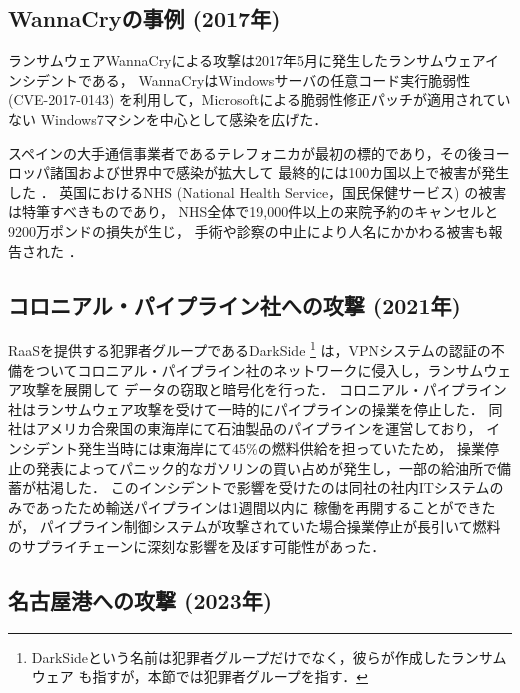 \subsection{WannaCryの事例 (2017年)}
ランサムウェアWannaCryによる攻撃は2017年5月に発生したランサムウェアインシデントである，
WannaCryはWindowsサーバの任意コード実行脆弱性 (CVE-2017-0143) を利用して，Microsoftによる脆弱性修正パッチが適用されていない
Windows7マシンを中心として感染を広げた．

スペインの大手通信事業者であるテレフォニカが最初の標的であり，その後ヨーロッパ諸国および世界中で感染が拡大して
最終的には100カ国以上で被害が発生した \cite{wannacry-attack}．
英国におけるNHS (National Health Service，国民保健サービス) の被害は特筆すべきものであり，
NHS全体で19,000件以上の来院予約のキャンセルと9200万ポンドの損失が生じ，
手術や診察の中止により人名にかかわる被害も報告された \cite{kaspersky-wannacry}．

\subsection{コロニアル・パイプライン社への攻撃 (2021年)}
RaaSを提供する犯罪者グループであるDarkSide \footnote{DarkSideという名前は犯罪者グループだけでなく，彼らが作成したランサムウェア \cite{DarkSide42:online}
  も指すが，本節では犯罪者グループを指す．}
は，VPNシステムの認証の不備をついてコロニアル・パイプライン社のネットワークに侵入し，ランサムウェア攻撃を展開して
データの窃取と暗号化を行った\cite{colonial-pipeline-attack}．
コロニアル・パイプライン社はランサムウェア攻撃を受けて一時的にパイプラインの操業を停止した．
同社はアメリカ合衆国の東海岸にて石油製品のパイプラインを運営しており，
インシデント発生当時には東海岸にて45\%の燃料供給を担っていたため，
操業停止の発表によってパニック的なガソリンの買い占めが発生し，一部の給油所で備蓄が枯渇した．
このインシデントで影響を受けたのは同社の社内ITシステムのみであったため輸送パイプラインは1週間以内に
稼働を再開することができたが，
パイプライン制御システムが攻撃されていた場合操業停止が長引いて燃料のサプライチェーンに深刻な影響を及ぼす可能性があった．

\subsection{名古屋港への攻撃 (2023年)}

